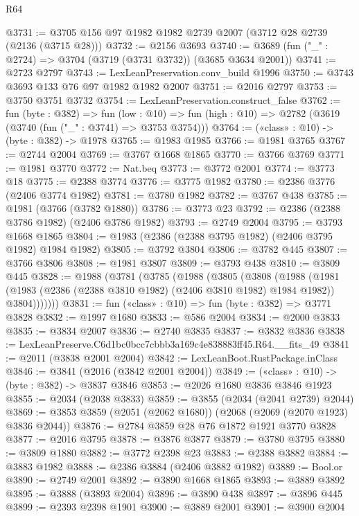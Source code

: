\begin{lexlean}{R64}
\begin{coremodule}
@3731 := @3705 @156 @97 @1982 @1982 @2739 @2007 (@3712 @28 @2739 (@2136 (@3715 @28)))
@3732 := @2156 @3693
@3740 := @3689 (fun ("_" : @2724) => @3704 (@3719 (@3731 @3732)) (@3685 @3634 @2001))
@3741 := @2723 @2797
@3743 := LexLeanPreservation.conv_build @1996
@3750 := @3743 @3693 @133 @76 @97 @1982 @1982 @2007
@3751 := @2016 @2797
@3753 := @3750 @3751 @3732
@3754 := LexLeanPreservation.construct_false
@3762 := fun (byte : @382) =>
  fun (low : @10) => fun (high : @10) => @2782 (@3619 (@3740 (fun ("_" : @3741) => @3753 @3754)))
@3764 := («class» : @10) -> (byte : @382) -> @1978
@3765 := @1983 @1985
@3766 := @1981 @3765
@3767 := @2744 @2004
@3769 := @3767 @1668 @1865
@3770 := @3766 @3769
@3771 := @1981 @3770
@3772 := Nat.beq
@3773 := @3772 @2001
@3774 := @3773 @18
@3775 := @2388 @3774
@3776 := @3775 @1982
@3780 := @2386 @3776 (@2406 @3774 @1982)
@3781 := @3780 @1982
@3782 := @3767 @438
@3785 := @1981 (@3766 (@3782 @1880))
@3786 := @3773 @23
@3792 := @2386 (@2388 @3786 @1982) (@2406 @3786 @1982)
@3793 := @2749 @2004
@3795 := @3793 @1668 @1865
@3804 := @1983 (@2386 (@2388 @3795 @1982) (@2406 @3795 @1982) @1984 @1982)
@3805 := @3792 @3804
@3806 := @3782 @445
@3807 := @3766 @3806
@3808 := @1981 @3807
@3809 := @3793 @438
@3810 := @3809 @445
@3828 := @1988
    (@3781
      (@3785
        (@1988
          (@3805
            (@3808
              (@1988
                (@1981
                  (@1983 (@2386 (@2388 @3810 @1982) (@2406 @3810 @1982) @1984 @1982))
                  @3804)))))))
@3831 := fun («class» : @10) => fun (byte : @382) => @3771 @3828
@3832 := @1997 @1680
@3833 := @586 @2004
@3834 := @2000 @3833
@3835 := @3834 @2007
@3836 := @2740 @3835
@3837 := @3832 @3836
@3838 := LexLeanPreserve.C6d1bc0bcc7cbbb3a169c4e838883ff45.R64.__fits_49
@3841 := @2011 (@3838 @2001 @2004)
@3842 := LexLeanBoot.RustPackage.inClass
@3846 := @3841 (@2016 (@3842 @2001 @2004))
@3849 := («class» : @10) -> (byte : @382) -> @3837 @3846
@3853 := @2026 @1680 @3836 @3846 @1923
@3855 := @2034 (@2038 @3833)
@3859 := @3855 (@2034 (@2041 @2739) @2044)
@3869 := @3853 @3859 (@2051 (@2062 @1680)) (@2068 (@2069 (@2070 @1923) @3836 @2044))
@3876 := @2784 @3859 @28 @76 @1872 @1921 @3770 @3828
@3877 := @2016 @3795
@3878 := @3876 @3877
@3879 := @3780 @3795
@3880 := @3809 @1880
@3882 := @3772 @2398 @23
@3883 := @2388 @3882
@3884 := @3883 @1982
@3888 := @2386 @3884 (@2406 @3882 @1982)
@3889 := Bool.or
@3890 := @2749 @2001
@3892 := @3890 @1668 @1865
@3893 := @3889 @3892
@3895 := @3888 (@3893 @2004)
@3896 := @3890 @438
@3897 := @3896 @445
@3899 := @2393 @2398 @1901
@3900 := @3889 @2001
@3901 := @3900 @2004

\end{coremodule}
\end{lexlean}
